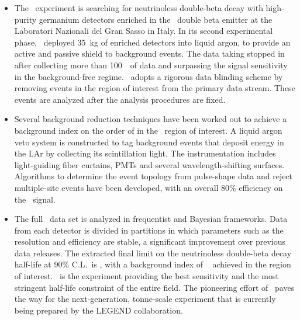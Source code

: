 \chapsummary
\begin{itemize}
  \item The \gerda\ experiment is searching for neutrinoless double-beta decay with
    high-purity germanium detectors enriched in the \gesix\ double beta emitter at the
    Laboratori Nazionali del Gran Sasso in Italy. In its second experimental phase,
    \gerda\ deployed 35~kg of enriched detectors into liquid argon, to provide an active
    and passive shield to background events. The data taking stopped in  after
    collecting more than 100~\kgyr\ of data and surpassing the  signal
    sensitivity in the background-free regime. \gerda\ adopts a rigorous data blinding
    scheme by removing events in the region of interest from the primary data stream.
    These events are analyzed after the analysis procedures are fixed.
  \item Several background reduction techniques have been worked out to achieve a
    background index on the order of  in the \onbb\ region of interest. A
    liquid argon veto system is constructed to tag background events that deposit energy
    in the LAr by collecting its scintillation light. The instrumentation includes
    light-guiding fiber curtains, PMTs and several wavelength-shifting surfaces.
    Algorithms to determine the event topology from pulse-shape data and reject
    multiple-site events have been developed, with an overall 80\% efficiency on the
    \onbb\ signal.
  \item The full \gerda\ data set is analyzed in frequentist and Bayesian frameworks. Data
    from each detector is divided in partitions in which parameters such as the resolution
    and efficiency are stable, a significant improvement over previous data releases. The
    extracted final limit on the neutrinoless double-beta decay half-life at 90\% C.L.~is
    \gerdafinallimit, with a background index of
    ~ achieved in the region of interest. \gerda\
    is the experiment providing the best sensitivity and the most stringent half-life
    constraint of the entire field. The pioneering effort of \gerda\ paves the way for the
    next-generation, tonne-scale experiment that is currently being prepared by the LEGEND
    collaboration.
\end{itemize}

